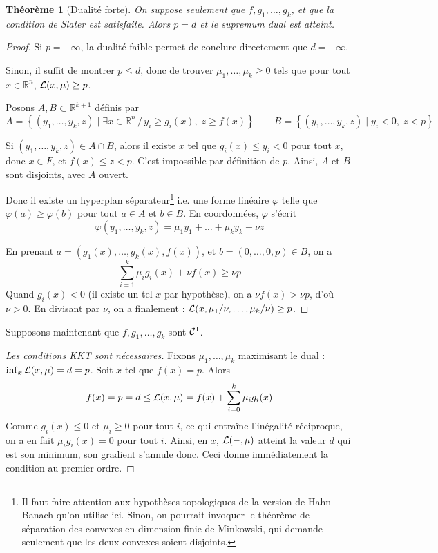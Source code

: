 \documentclass[a4paper, 11pt]{article}
\def\R{\mathbb{R}}
\def\L{{\cal{L}}}
\def\Cf{{\cal{C}}}
\newtheorem*{theorem}{Théorème}
\begin{document}
\begin{theorem}[Dualité forte]
  On suppose seulement que $f, g_1, \ldots, g_k$, et que la condition de Slater
  est satisfaite. Alors $p = d$ et le supremum dual est atteint.
\end{theorem}
\begin{proof}
  Si $p = -\infty$, la dualité faible permet de conclure directement que $d =
  -\infty$.
  
  Sinon, il suffit de montrer $p \leq d$, donc de trouver $\mu_1, \ldots, \mu_k
  \geq 0$ tels que pour tout $x \in \R^n$, $\L(x,\mu) \geq p$.

  Posons $A, B \subset \R^{k+1}$ définis par
  \[ A = \left\{ (y_1, \ldots, y_k, z) \mid \exists x \in \R^n\,/\,
    y_i \geq g_i(x),\; z \geq f(x) \right\}
    \qquad B = \left\{ (y_1, \ldots, y_k, z) \mid y_i < 0,\;z < p \right\}\]

  Si $(y_1,\ldots,y_k,z) \in A \cap B$, alors il existe $x$ tel que $g_i(x) \leq
  y_i < 0$ pour tout $x$, donc $x \in F$, et $f(x) \leq z < p$. C'est impossible
  par définition de $p$. Ainsi, $A$ et $B$ sont disjoints, avec $A$ ouvert.
  
  Donc il existe un hyperplan séparateur\footnote{Il faut faire attention aux
    hypothèses topologiques de la version de Hahn-Banach qu'on utilise ici.
    Sinon, on pourrait invoquer le théorème de séparation des convexes en
    dimension finie de Minkowski, qui demande seulement que les deux convexes
    soient disjoints.} i.e. une forme linéaire $\varphi$ telle que $\varphi(a) \geq
  \varphi(b)$ pour tout $a \in A$ et $b \in B$. En coordonnées, $\varphi$ s'écrit
  \[ \varphi(y_1, \ldots, y_k, z) = \mu_1 y_1 + \ldots + \mu_k y_k + \nu z \]
  
  En prenant $a = (g_1(x), \ldots, g_k(x), f(x))$, et $b = (0, \ldots, 0, p) \in
  \overline{B}$, on a
  \[ \sum_{i=1}^k \mu_i g_i(x) + \nu f(x) \geq \nu p \]
  Quand $g_i(x) < 0$ (il existe un tel $x$ par hypothèse), on a $\nu f(x) > \nu
  p$, d'où $\nu > 0$. En divisant par $\nu$, on a finalement :
  $\L(x, \mu_1/\nu, \ldots, \mu_k/\nu) \geq p$.
\end{proof}

Supposons maintenant que $f, g_1, \ldots, g_k$ sont $\Cf^1$. 
\begin{proof}[Les conditions KKT sont nécessaires]
  Fixons $\mu_1, \ldots, \mu_k$ maximisant le dual : $\inf_x \L(x, \mu) = d =
  p$. Soit $x$ tel que $f(x) = p$. Alors
  \[ f(x) = p = d \leq \L(x, \mu) = f(x) + \sum_{i=0}^k \mu_i g_i(x) \] Comme
  $g_i(x) \leq 0$ et $\mu_i \geq 0$ pour tout $i$, ce qui entraîne l'inégalité
  réciproque, on a en fait $\mu_i g_i(x) = 0$ pour tout $i$. Ainsi, en $x$,
  $\L(-, \mu)$ atteint la valeur $d$ qui est son minimum, son gradient s'annule
  donc. Ceci donne immédiatement la condition au premier ordre.
\end{proof}
\end{document}
